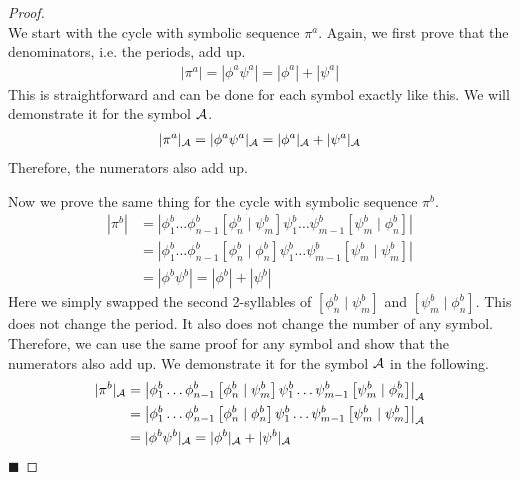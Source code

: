 \begin{proof} \phantom{x} \\
	We start with the cycle with symbolic sequence $\pi^a$.
	Again, we first prove that the denominators, i.e. the periods, add up.
	\begin{align*}
		|\pi^a| = |\phi^a\psi^a| = |\phi^a| + |\psi^a|
	\end{align*}
	This is straightforward and can be done for each symbol exactly like this.
	We will demonstrate it for the symbol $\mathcal{A}$.
	\begin{align*}
		|\pi^a|_{\mathcal{A}} = |\phi^a\psi^a|_{\mathcal{A}} = |\phi^a|_{\mathcal{A}} + |\psi^a|_{\mathcal{A}}
	\end{align*}
	Therefore, the numerators also add up.

	Now we prove the same thing for the cycle with symbolic sequence $\pi^b$.
	\begin{align*}
		|\pi^b| & = \left|\phi^b_1 \dots \phi^b_{n-1} \left[\phi^b_n \mid \psi^b_m\right] \psi^b_1 \dots \psi^b_{m-1} \left[\psi^b_m \mid \phi^b_n\right]\right| \\
		        & = \left|\phi^b_1 \dots \phi^b_{n-1} \left[\phi^b_n \mid \phi^b_n\right] \psi^b_1 \dots \psi^b_{m-1} \left[\psi^b_m \mid \psi^b_m\right]\right| \\
		        & = |\phi^b \psi^b| = |\phi^b| + |\psi^b|
	\end{align*}
	Here we simply swapped the second 2-syllables of $\left[\phi^b_n \mid \psi^b_m\right]$ and $\left[\psi^b_m \mid \phi^b_n\right]$.
	This does not change the period.
	It also does not change the number of any symbol.
	Therefore, we can use the same proof for any symbol and show that the numerators also add up.
	We demonstrate it for the symbol $\mathcal{A}$ in the following.
	\begin{align*}
		|\pi^b|_{\mathcal{A}} & = \left|\phi^b_1 \dots \phi^b_{n-1} \left[\phi^b_n \mid \psi^b_m\right] \psi^b_1 \dots \psi^b_{m-1} \left[\psi^b_m \mid \phi^b_n\right]\right|_{\mathcal{A}} \\
		           & = \left|\phi^b_1 \dots \phi^b_{n-1} \left[\phi^b_n \mid \phi^b_n\right] \psi^b_1 \dots \psi^b_{m-1} \left[\psi^b_m \mid \psi^b_m\right]\right|_{\mathcal{A}} \\
		           & = |\phi^b \psi^b|_{\mathcal{A}} = |\phi^b|_{\mathcal{A}} + |\psi^b|_{\mathcal{A}}
	\end{align*}
	\hfill $\blacksquare$
\end{proof}

